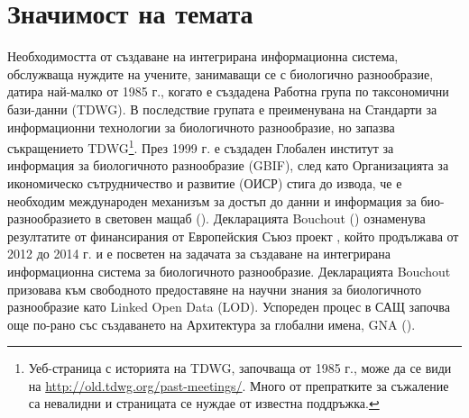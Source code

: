 \label{chapter-introduction} 
\newcommand{\keyword}[1]{\textbf{#1}}
\newcommand{\tabhead}[1]{\textbf{#1}}
\newcommand{\code}[1]{\texttt{#1}}
\newcommand{\file}[1]{\texttt{\bfseries#1}}
\newcommand{\option}[1]{\texttt{\itshape#1}}
\section* {Значимост на темата}
Необходимостта от създаване на интегрирана информационна система, обслужваща нуждите на учените, занимаващи се с биологично разнообразие, датира най-малко от 1985 г., когато е създадена Работна група по таксономични бази-данни (TDWG). В последствие групата е преименувана на Стандарти за информационни технологии за биологичното разнообразие, но запазва съкращението TDWG\footnote{Уеб-страница с историята на TDWG, започваща от 1985 г., може да се види на \url{http://old.tdwg.org/past-meetings/}. Много от препратките за съжаление са невалидни и страницата се нуждае от известна поддръжка.}. През 1999 г. е създаден Глобален институт за информация за биологичното разнообразие (GBIF), след като Организацията за икономическо сътрудничество и развитие (ОИСР) стига до извода, че е необходим международен механизъм за достъп до данни и информация за био-разнообразието в световен мащаб (\cite{noauthor_what_nodate}). Декларацията Bouchout (\cite{noauthor_bouchout_2014}) ознаменува резултатите от финансирания от Европейския Съюз проект \cite {noauthor_pro-ibiosphere_nodate}, който продължава от 2012 до 2014 г. и е посветен на задачата за създаване на интегрирана информационна система за биологичното разнообразие. Декларацията Bouchout призовава към свободното предоставяне на научни знания за биологичното разнообразие като Linked Open Data (LOD). Успореден процес в САЩ започва още по-рано със създаването на Архитектура за глобални имена, GNA (\cite{patterson_names_2010, pyle_towards_2016}).

